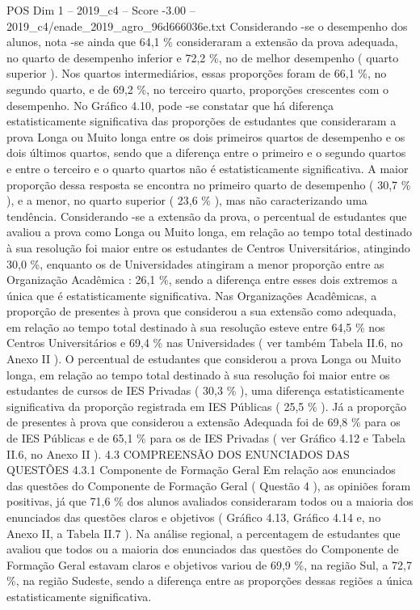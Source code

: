 \begin{textsample}{POS Dim 1 – 2019\_c4 – Score -3.00 – 2019\_c4/enade\_2019\_agro\_96d666036e.txt}
Considerando -se o desempenho dos alunos, nota -se ainda que 64,1 \% consideraram a extensão da prova adequada, no quarto de desempenho inferior e 72,2 \%, no de melhor desempenho ( quarto superior ).
Nos quartos intermediários, essas proporções foram de 66,1 \%, no segundo quarto, e de 69,2 \%, no terceiro quarto, proporções crescentes com o desempenho.
No Gráfico 4.10, pode -se constatar que há diferença estatisticamente significativa das proporções de estudantes que consideraram a prova Longa ou Muito longa entre os dois primeiros quartos de desempenho e os dois últimos quartos, sendo que a diferença entre o primeiro e o segundo quartos e entre o terceiro e o quarto quartos não é estatisticamente significativa.
A maior proporção dessa resposta se encontra no primeiro quarto de desempenho ( 30,7 \% ), e a menor, no quarto superior ( 23,6 \% ), mas não caracterizando uma tendência.
Considerando -se a extensão da prova, o percentual de estudantes que avaliou a prova como Longa ou Muito longa, em relação ao tempo total destinado à sua resolução foi maior entre os estudantes de Centros Universitários, atingindo 30,0 \%, enquanto os de Universidades atingiram a menor proporção entre as Organização Acadêmica : 26,1 \%, sendo a diferença entre esses dois extremos a única que é estatisticamente significativa.
Nas Organizações Acadêmicas, a proporção de presentes à prova que considerou a sua extensão como adequada, em relação ao tempo total destinado à sua resolução esteve entre 64,5 \% nos Centros Universitários e 69,4 \% nas Universidades ( ver também Tabela II.6, no Anexo II ).
O percentual de estudantes que considerou a prova Longa ou Muito longa, em relação ao tempo total destinado à sua resolução foi maior entre os estudantes de cursos de IES Privadas ( 30,3 \% ), uma diferença estatisticamente significativa da proporção registrada em IES Públicas ( 25,5 \% ).
Já a proporção de presentes à prova que considerou a extensão Adequada foi de 69,8 \% para os de IES Públicas e de 65,1 \% para os de IES Privadas ( ver Gráfico 4.12 e Tabela II.6, no Anexo II ). 4.3 COMPREENSÃO DOS ENUNCIADOS DAS QUESTÕES 4.3.1 Componente de Formação Geral Em relação aos enunciados das questões do Componente de Formação Geral ( Questão 4 ), as opiniões foram positivas, já que 71,6 \% dos alunos avaliados consideraram todos ou a maioria dos enunciados das questões claros e objetivos ( Gráfico 4.13, Gráfico 4.14 e, no Anexo II, a Tabela II.7 ).
Na análise regional, a percentagem de estudantes que avaliou que todos ou a maioria dos enunciados das questões do Componente de Formação Geral estavam claros e objetivos variou de 69,9 \%, na região Sul, a 72,7 \%, na região Sudeste, sendo a diferença entre as proporções dessas regiões a única estatisticamente significativa.

\end{textsample}
